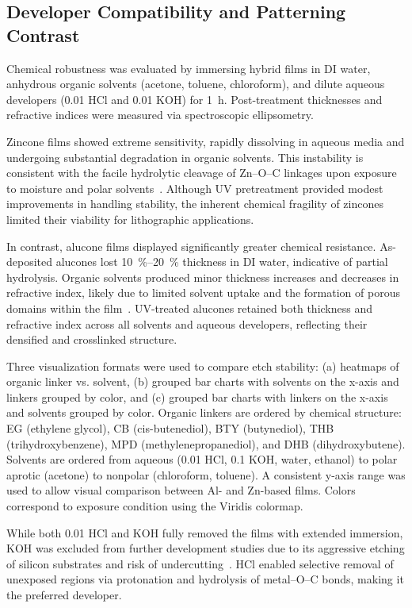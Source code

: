 \subsection{Developer Compatibility and Patterning Contrast}

Chemical robustness was evaluated by immersing hybrid films in DI water, anhydrous organic solvents (acetone, toluene, chloroform), and dilute aqueous developers (\SI{0.01}{\molar} HCl and \SI{0.01}{\molar} KOH) for \SI{1}{\hour}. Post-treatment thicknesses and refractive indices were measured via spectroscopic ellipsometry.

Zincone films showed extreme sensitivity, rapidly dissolving in aqueous media and undergoing substantial degradation in organic solvents. This instability is consistent with the facile hydrolytic cleavage of Zn--O--C linkages upon exposure to moisture and polar solvents~\cite{King2009}. Although UV pretreatment provided modest improvements in handling stability, the inherent chemical fragility of zincones limited their viability for lithographic applications.

In contrast, alucone films displayed significantly greater chemical resistance. As-deposited alucones lost \SIrange{10}{20}{\percent} thickness in DI water, indicative of partial hydrolysis. Organic solvents produced minor thickness increases and decreases in refractive index, likely due to limited solvent uptake and the formation of porous domains within the film~\cite{Vemuri2008}. UV-treated alucones retained both thickness and refractive index across all solvents and aqueous developers, reflecting their densified and crosslinked structure.

Three visualization formats were used to compare etch stability: (a) heatmaps of organic linker vs. solvent, (b) grouped bar charts with solvents on the x-axis and linkers grouped by color, and (c) grouped bar charts with linkers on the x-axis and solvents grouped by color. Organic linkers are ordered by chemical structure: EG (ethylene glycol), CB (cis-butenediol), BTY (butynediol), THB (trihydroxybenzene), MPD (methylenepropanediol), and DHB (dihydroxybutene). Solvents are ordered from aqueous (\SI{0.01}{\molar} HCl, \SI{0.1}{\molar} KOH, water, ethanol) to polar aprotic (acetone) to nonpolar (chloroform, toluene). A consistent y-axis range was used to allow visual comparison between Al- and Zn-based films. Colors correspond to exposure condition using the Viridis colormap.

While both \SI{0.01}{\molar} HCl and KOH fully removed the films with extended immersion, KOH was excluded from further development studies due to its aggressive etching of silicon substrates and risk of undercutting~\cite{Horie2010}. HCl enabled selective removal of unexposed regions via protonation and hydrolysis of metal--O--C bonds, making it the preferred developer.

